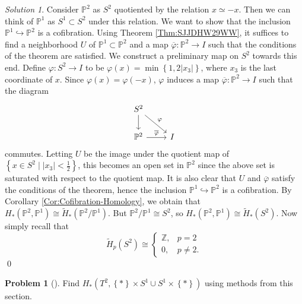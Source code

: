\documentclass[reqno]{amsart}
\theoremstyle{definition}
\newtheorem{problem}[theorem]{Problem}
\theoremstyle{remark}
\newtheorem*{solution}{Solution}
\begin{document}
\begin{solution}
    Consider $\mathbb{P}^2$ as 
    $S^2$ quotiented by the relation
    $x \simeq -x$. Then
    we can think of  $\mathbb{P}^{1}$ as
    $S^{1} \subset S^{2}$ under this relation.
    We want to show that the inclusion
    $\mathbb{P}^{1} \hookrightarrow \mathbb{P}^2$ is a
    cofibration. 
    Using Theorem \ref{Thm:SJJDHW29WW}, it suffices to
    find a neighborhood $U$ of $\mathbb{P}^{1} \subset 
    \mathbb{P}^2$ and a map $\overline{\varphi } \colon
    \mathbb{P}^2 \to I$ such that
    the conditions of the theorem are satisfied.
    We construct a preliminary map on
    $S^2$ towards this end. 
    Define $\varphi \colon S^2 \to I$ to be
    $\varphi (x) = 
    \min \left\{ 1, 2 \left| x_3 \right|  \right\} $, where
    $x_3$ is the last coordinate of $x$. Since
    $\varphi (x) = \varphi (-x)$, $\varphi $ induces
    a map $\overline{\varphi }\colon
    \mathbb{P}^2 \to I$ such that the diagram
    \begin{equation*}
    \begin{tikzcd}
        S^2 \ar[d] \ar[dr, "\varphi "] & \\
        \mathbb{P}^2 \ar[r, "\overline{\varphi }"] & I
    \end{tikzcd}
    \end{equation*}
    commutes.
    Letting $U$ be the image under the quotient
    map of 
    $\left\{ x \in S^2  \mid 
    \left| x_3 \right| < \frac{1}{2} \right\} $, this
    becomes an open set in $\mathbb{P}^2$ since 
    the above set is saturated with respect to the quotient
    map. It is also clear that
    $U$ and $\overline{\varphi }$ satisfy the conditions of
    the theorem, hence the inclusion
    $\mathbb{P}^{1} \hookrightarrow \mathbb{P}^2$ is a cofibration.
    By Corollary \ref{Cor:Cofibration-Homology}, we
    obtain that
    $H_* \left( \mathbb{P}^2, \mathbb{P}^{1} \right) 
    \cong \tilde{H}_* \left( \mathbb{P}^2 / \mathbb{P}^{1} \right) $.
    But $\mathbb{P}^2 / \mathbb{P}^{1} \cong
    S^{2}$, so
    $H_* \left( \mathbb{P}^2, \mathbb{P}^{1} \right) 
    \cong \tilde{H}_* \left( S^2 \right)$.
    Now simply recall that
    \[
    \tilde{H}_p \left( S^2 \right) 
    \cong
    \begin{cases}
        \mathbb{Z},& p = 2\\
        0,& p \neq 2.
    \end{cases}
    \] 
    \qed
\end{solution}

\begin{problem}[]
    Find $H_*\left( T^2,
    \left\{ * \right\} \times S^{1} \cup 
S^{1} \times \left\{ * \right\} \right) $ using
methods from this section.
\end{problem}
\end{document}
